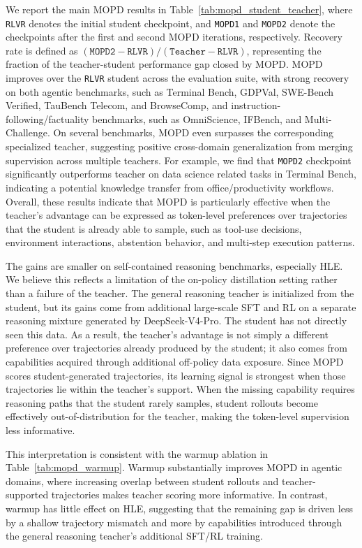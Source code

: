 We report the main MOPD results in Table~\ref{tab:mopd_student_teacher}, where \texttt{RLVR} denotes the initial student checkpoint, and \texttt{MOPD1} and \texttt{MOPD2} denote the checkpoints after the first and second MOPD iterations, respectively. Recovery rate is defined as $(\texttt{MOPD2}-\texttt{RLVR})/(\texttt{Teacher}-\texttt{RLVR})$, representing the fraction of the teacher-student performance gap closed by MOPD. MOPD improves over the \texttt{RLVR} student across the evaluation suite, with strong recovery on both agentic benchmarks, such as Terminal Bench, GDPVal, SWE-Bench Verified, TauBench Telecom, and BrowseComp, and instruction-following/factuality benchmarks, such as OmniScience, IFBench, and Multi-Challenge. On several benchmarks, MOPD even surpasses the corresponding specialized teacher, suggesting positive cross-domain generalization from merging supervision across multiple teachers. For example, we find that \texttt{MOPD2} checkpoint significantly outperforms teacher on data science related tasks in Terminal Bench, indicating a potential knowledge transfer from office/productivity workflows. Overall, these results indicate that MOPD is particularly effective when the teacher's advantage can be expressed as token-level preferences over trajectories that the student is already able to sample, such as tool-use decisions, environment interactions, abstention behavior, and multi-step execution patterns.

The gains are smaller on self-contained reasoning benchmarks, especially HLE. We believe this reflects a limitation of the on-policy distillation setting rather than a failure of the teacher. The general reasoning teacher is initialized from the student, but its gains come from additional large-scale SFT and RL on a separate reasoning mixture generated by DeepSeek-V4-Pro. The student has not directly seen this data. As a result, the teacher's advantage is not simply a different preference over trajectories already produced by the student; it also comes from capabilities acquired through additional off-policy data exposure. Since MOPD scores student-generated trajectories, its learning signal is strongest when those trajectories lie within the teacher's support. When the missing capability requires reasoning paths that the student rarely samples, student rollouts become effectively out-of-distribution for the teacher, making the token-level supervision less informative.


This interpretation is consistent with the warmup ablation in Table~\ref{tab:mopd_warmup}. Warmup substantially improves MOPD in agentic domains, where increasing overlap between student rollouts and teacher-supported trajectories makes teacher scoring more informative. In contrast, warmup has little effect on HLE, suggesting that the remaining gap is driven less by a shallow trajectory mismatch and more by capabilities introduced through the general reasoning teacher's additional SFT/RL training.

